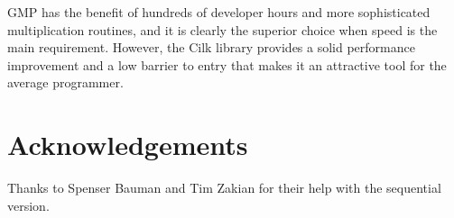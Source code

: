 \documentclass[8pt, twocolumn]{article}
\begin{document}
GMP has the benefit of hundreds of developer hours and more sophisticated
multiplication routines, and it is clearly the superior choice when speed is the
main requirement.  However, the Cilk library provides a solid performance
improvement and a low barrier to entry that makes it an attractive tool for the
average programmer.

\section{Acknowledgements}
Thanks to Spenser Bauman and Tim Zakian for their help with the sequential
version.

%
%
\end{document}

